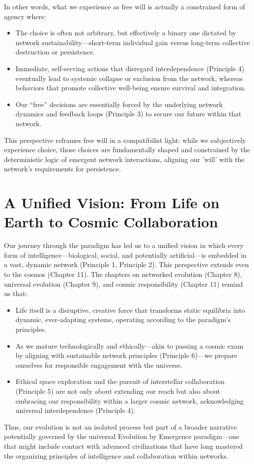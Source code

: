 In other words, what we experience as free will is actually a constrained form of agency where:
\begin{itemize}
    \item The choice is often not arbitrary, but effectively a binary one dictated by network sustainability—short-term individual gain versus long-term collective destruction or persistence.
    \item Immediate, self-serving actions that disregard interdependence (Principle 4) eventually lead to systemic collapse or exclusion from the network, whereas behaviors that promote collective well-being ensure survival and integration.
    \item Our “free” decisions are essentially forced by the underlying network dynamics and feedback loops (Principle 3) to secure our future within that network.
\end{itemize}
This perspective reframes free will in a compatibilist light: while we subjectively experience choice, those choices are fundamentally shaped and constrained by the deterministic logic of emergent network interactions, aligning our 'will' with the network's requirements for persistence. %

\section{A Unified Vision: From Life on Earth to Cosmic Collaboration}
Our journey through the paradigm has led us to a unified vision in which every form of intelligence—biological, social, and potentially artificial—is embedded in a vast, dynamic network (Principle 1, Principle 2). This perspective extends even to the cosmos (Chapter 11). The chapters on networked evolution (Chapter 8), universal evolution (Chapter 9), and cosmic responsibility (Chapter 11) remind us that:
\begin{itemize}
    \item Life itself is a disruptive, creative force that transforms static equilibria into dynamic, ever-adapting systems, operating according to the paradigm's principles.
    \item As we mature technologically and ethically—akin to passing a cosmic exam by aligning with sustainable network principles (Principle 6)—we prepare ourselves for responsible engagement with the universe.
    \item Ethical space exploration and the pursuit of interstellar collaboration (Principle 5) are not only about extending our reach but also about embracing our responsibility within a larger cosmic network, acknowledging universal interdependence (Principle 4).
\end{itemize}
Thus, our evolution is not an isolated process but part of a broader narrative potentially governed by the universal Evolution by Emergence paradigm—one that might include contact with advanced civilizations that have long mastered the organizing principles of intelligence and collaboration within networks. %

